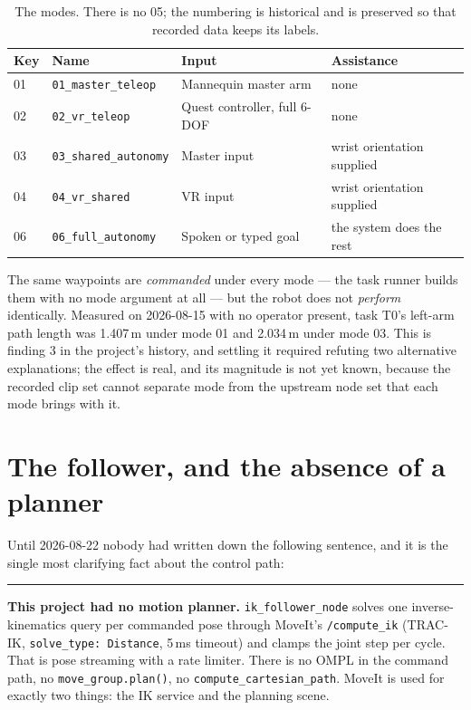 \documentclass[11pt,a4paper,oneside]{report}
\newcommand{\code}[1]{\texttt{\small #1}}
\newcommand{\keyfact}[1]{%
  \par\vspace{7pt}\noindent
  \hspace*{0pt}\textcolor{srlblue}{\rule{2.5pt}{\dimexpr\baselineskip\relax}}%
  \hspace{9pt}%
  \begin{minipage}[t]{\dimexpr\textwidth-14pt\relax}
  \small #1
  \end{minipage}\par\vspace{7pt}}
\begin{document}
\begin{table}[H]
\centering
\small
\begin{tabularx}{\textwidth}{@{}llXl@{}}
\toprule
\textbf{Key} & \textbf{Name} & \textbf{Input} & \textbf{Assistance} \\
\midrule
01 & \code{01\_master\_teleop} & Mannequin master arm & none \\
02 & \code{02\_vr\_teleop} & Quest controller, full 6-DOF & none \\
03 & \code{03\_shared\_autonomy} & Master input & wrist orientation supplied \\
04 & \code{04\_vr\_shared} & VR input & wrist orientation supplied \\
06 & \code{06\_full\_autonomy} & Spoken or typed goal & the system does the rest \\
\bottomrule
\end{tabularx}
\caption{The modes. There is no 05; the numbering is historical and is
preserved so that recorded data keeps its labels.}
\end{table}

The same waypoints are \emph{commanded} under every mode --- the task runner
builds them with no mode argument at all --- but the robot does not
\emph{perform} identically. Measured on 2026-08-15 with no operator present,
task T0's left-arm path length was 1.407\,m under mode 01 and 2.034\,m under
mode 03. This is finding 3 in the project's history, and settling it required
refuting two alternative explanations; the effect is real, and its magnitude is
not yet known, because the recorded clip set cannot separate mode from the
upstream node set that each mode brings with it.

\section{The follower, and the absence of a planner}

Until 2026-08-22 nobody had written down the following sentence, and it is the
single most clarifying fact about the control path:

\keyfact{\textbf{This project had no motion planner.} \code{ik\_follower\_node}
solves one inverse-kinematics query per commanded pose through MoveIt's
\code{/compute\_ik} (TRAC-IK, \code{solve\_type: Distance}, 5\,ms timeout) and
clamps the joint step per cycle. That is pose streaming with a rate limiter.
There is no OMPL in the command path, no \code{move\_group.plan()}, no
\code{compute\_cartesian\_path}. MoveIt is used for exactly two things: the IK
service and the planning scene.}
\end{document}
